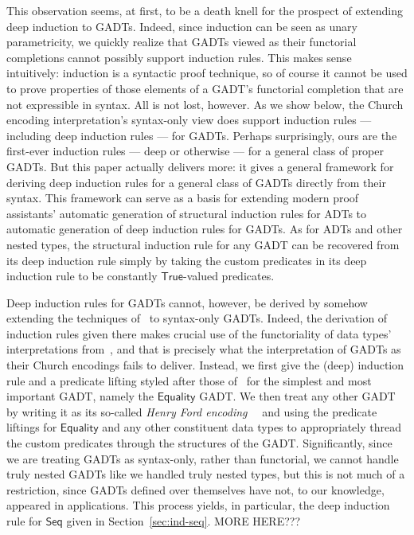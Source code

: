 \documentclass[9pt]{entcs}
\begin{document}
This observation seems, at first, to be a death knell for the prospect
of extending deep induction to GADTs. Indeed, since induction can be
seen as unary parametricity, we quickly realize that GADTs viewed as
their functorial completions cannot possibly support induction rules.
This makes sense intuitively: induction is a syntactic proof
technique, so of course it cannot be used to prove properties of those
elements of a GADT's functorial completion that are not expressible in
syntax. All is not lost, however. As we show below, the Church
encoding interpretation's syntax-only view does support induction
rules --- including deep induction rules --- for GADTs. Perhaps
surprisingly, ours are the first-ever induction rules --- deep or
otherwise --- for a general class of proper GADTs. But this paper
actually delivers more: it gives a general framework for deriving deep
induction rules for a general class of GADTs directly from their
syntax. This framework can serve as a basis for extending modern proof
assistants' automatic generation of structural induction rules for
ADTs to automatic generation of deep induction rules for GADTs. As
for ADTs and other nested types, the structural induction rule for any
GADT can be recovered from its deep induction rule simply by taking
the custom predicates in its deep induction rule to be constantly
$\mathsf{True}$-valued predicates.

Deep induction rules for GADTs cannot, however, be derived by somehow
extending the techniques of~\cite{jp20} to syntax-only GADTs. Indeed,
the derivation of induction rules given there makes crucial use of the
functoriality of data types' interpretations from~\cite{jp19}, and
that is precisely what the interpretation of GADTs as their Church
encodings fails to deliver. Instead, we first give the (deep)
induction rule and a predicate lifting styled after those
of~\cite{jp20} for the simplest and most important GADT, namely the
$\mathsf{Equality}$ GADT. We then treat any other GADT by writing it
as its so-called {\em Henry Ford
  encoding}~~\cite{ch03,hin03,mcb99,sjsv09,sp04} and using the
predicate liftings for $\mathsf{Equality}$ and any other constituent
data types to appropriately thread the custom predicates through the
structures of the GADT. {\color{red} Significantly, since we are
  treating GADTs as syntax-only, rather than functorial, we cannot
  handle truly nested GADTs like we handled truly nested types, but
  this is not much of a restriction, since GADTs defined over
  themselves have not, to our knowledge, appeared in applications.}
This process yields, in particular, the deep induction rule for
$\mathsf{Seq}$ given in Section~\ref{sec:ind-seq}. {\color{red} MORE
  HERE???}
\end{document}
